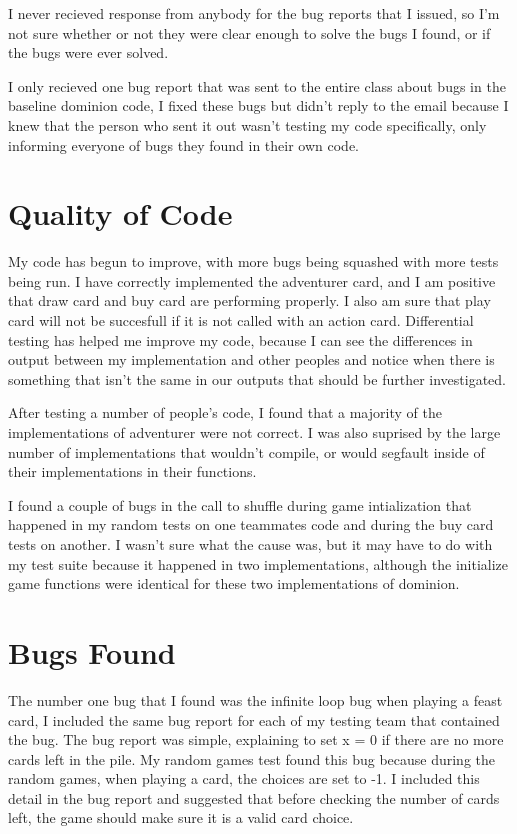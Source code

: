 \documentclass[letterpaper,12pt]{article}
\begin{document}
I never recieved response from anybody for the bug reports that I issued, so I'm not sure whether or not
they were clear enough to solve the bugs I found, or if the bugs were ever solved.

I only recieved one bug report that was sent to the entire class about bugs in the baseline dominion code,
I fixed these bugs but didn't reply to the email because I knew that the person who sent it out wasn't testing
my code specifically, only informing everyone of bugs they found in their own code.

\section{Quality of Code}
My code has begun to improve, with more bugs being squashed with more tests being run. I have correctly
implemented the adventurer card, and I am positive that draw card and buy card are performing properly. I also
am sure that play card will not be succesfull if it is not called with an action card. Differential
testing has helped me improve my code, because I can see the differences in output between my implementation and
other peoples and notice when there is something that isn't the same in our outputs that should be further investigated. 

After testing a number of people's code, I found that a majority of the implementations of adventurer were not correct. 
I was also suprised by the large number of implementations that wouldn't compile, or would segfault inside of their
implementations in their functions. 

I found a couple of bugs in the call to shuffle during game intialization that happened in my random tests on one teammates code
and during the buy card tests on another. I wasn't sure what the cause was, but it may have to do with my test suite because it 
happened in two implementations, although the initialize game functions were identical for these two implementations of dominion.

\section{Bugs Found}
The number one bug that I found was the infinite loop bug when playing a feast card, I included
the same bug report for each of my testing team that contained the bug. The bug report was simple,
explaining to set x = 0 if there are no more cards left in the pile. My random games test found this bug
because during the random games, when playing a card, the choices are set to -1. I included this detail in
the bug report and suggested that before checking the number of cards left, the game should make sure it is
a valid card choice.
\end{document}
